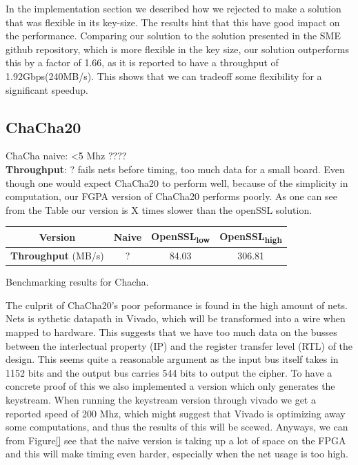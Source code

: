 \documentclass[a4paper]{article}
\begin{document}
In the implementation section we described how we rejected to make a solution that was flexible in its key-size. The results hint that this have good impact on the performance. Comparing our solution to the solution presented in the SME github repository, which is more flexible in the key size, our solution outperforms this by a factor of 1.66, as it is reported to have a throughput of 1.92Gbps(240MB/s)\cite{sme}. This shows that we can tradeoff some flexibility for a significant speedup.


\subsection{ChaCha20}
\label{sec:org0d6dbf9}
ChaCha naive: <5 Mhz ????\\
\textbf{Throughput}: ?
fails nets before timing, too much data for a small board.
Even though one would expect ChaCha20 to perform well, because of the simplicity in computation, our FGPA version of ChaCha20 performs poorly. As one can see from the Table our version is X times slower than the openSSL solution.
\begin{table}[htbp]
\centering
\begin{tabular}{|c|c|c|c|}
\hline
\textbf{Version} & Naive & OpenSSL\textsubscript{low} & OpenSSL\textsubscript{high}\\
\hline
\textbf{Throughput} (MB/s) & ? & 84.03 & 306.81\\
\hline
\end{tabular}
Benchmarking results for Chacha.

\end{table}
The culprit of ChaCha20's poor peformance is found in the high amount of nets. Nets is sythetic datapath in Vivado, which will be transformed into a wire when mapped to hardware. This suggests that we have too much data on the busses between the interlectual property (IP) and the register transfer level (RTL) of the design. This seems quite a reasonable argument as the input bus itself takes in 1152 bits and the output bus carries 544 bits to output the cipher.
To have a concrete proof of this we also implemented a version which only generates the keystream. When running the keystream version through vivado we get a reported speed of 200 Mhz, which might suggest that Vivado is optimizing away some computations, and thus the results of this will be scewed. Anyways, we can from Figure\ref{} see that the naive version is taking up a lot of space on the FPGA and this will make timing even harder, especially when the net usage is too high.
\end{document}
